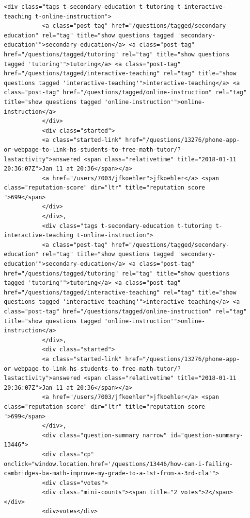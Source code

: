 \documentclass[11pt]{article}
\begin{document}
\begin{Verbatim}[commandchars=\\\{\}]
           <div class="tags t-secondary-education t-tutoring t-interactive-teaching t-online-instruction">
           <a class="post-tag" href="/questions/tagged/secondary-education" rel="tag" title="show questions tagged 'secondary-education'">secondary-education</a> <a class="post-tag" href="/questions/tagged/tutoring" rel="tag" title="show questions tagged 'tutoring'">tutoring</a> <a class="post-tag" href="/questions/tagged/interactive-teaching" rel="tag" title="show questions tagged 'interactive-teaching'">interactive-teaching</a> <a class="post-tag" href="/questions/tagged/online-instruction" rel="tag" title="show questions tagged 'online-instruction'">online-instruction</a>
           </div>
           <div class="started">
           <a class="started-link" href="/questions/13276/phone-app-or-webpage-to-link-hs-students-to-free-math-tutor/?lastactivity">answered <span class="relativetime" title="2018-01-11 20:36:07Z">Jan 11 at 20:36</span></a>
           <a href="/users/7003/jfkoehler">jfkoehler</a> <span class="reputation-score" dir="ltr" title="reputation score ">699</span>
           </div>
           </div>,
           <div class="tags t-secondary-education t-tutoring t-interactive-teaching t-online-instruction">
           <a class="post-tag" href="/questions/tagged/secondary-education" rel="tag" title="show questions tagged 'secondary-education'">secondary-education</a> <a class="post-tag" href="/questions/tagged/tutoring" rel="tag" title="show questions tagged 'tutoring'">tutoring</a> <a class="post-tag" href="/questions/tagged/interactive-teaching" rel="tag" title="show questions tagged 'interactive-teaching'">interactive-teaching</a> <a class="post-tag" href="/questions/tagged/online-instruction" rel="tag" title="show questions tagged 'online-instruction'">online-instruction</a>
           </div>,
           <div class="started">
           <a class="started-link" href="/questions/13276/phone-app-or-webpage-to-link-hs-students-to-free-math-tutor/?lastactivity">answered <span class="relativetime" title="2018-01-11 20:36:07Z">Jan 11 at 20:36</span></a>
           <a href="/users/7003/jfkoehler">jfkoehler</a> <span class="reputation-score" dir="ltr" title="reputation score ">699</span>
           </div>,
           <div class="question-summary narrow" id="question-summary-13446">
           <div class="cp" onclick="window.location.href='/questions/13446/how-can-i-failing-cambridges-ba-math-improve-my-grade-to-a-1st-from-a-3rd-cla'">
           <div class="votes">
           <div class="mini-counts"><span title="2 votes">2</span></div>
           <div>votes</div>

\end{Verbatim}
\end{document}
